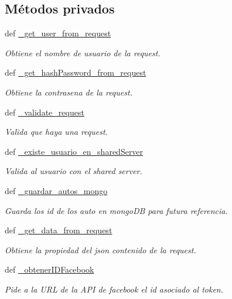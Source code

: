 \subsection*{Métodos privados}
\begin{DoxyCompactItemize}
\item 
def \hyperlink{classsrc_1_1resources_1_1auth_1_1_auth_ad45756ae9f2bf3840d6fe69fc305f86d}{\-\_\-get\-\_\-user\-\_\-from\-\_\-request}
\begin{DoxyCompactList}\small\item\em Obtiene el nombre de usuario de la request. \end{DoxyCompactList}\item 
def \hyperlink{classsrc_1_1resources_1_1auth_1_1_auth_a85f8056c2198f62284ada1f9f40a72f2}{\-\_\-get\-\_\-hash\-Password\-\_\-from\-\_\-request}
\begin{DoxyCompactList}\small\item\em Obtiene la contrasena de la request. \end{DoxyCompactList}\item 
def \hyperlink{classsrc_1_1resources_1_1auth_1_1_auth_acd72657f2bddc8a60a3103f418460d57}{\-\_\-validate\-\_\-request}
\begin{DoxyCompactList}\small\item\em Valida que haya una request. \end{DoxyCompactList}\item 
def \hyperlink{classsrc_1_1resources_1_1auth_1_1_auth_ab140f80e50617f4d4f4a58b40391710f}{\-\_\-existe\-\_\-usuario\-\_\-en\-\_\-shared\-Server}
\begin{DoxyCompactList}\small\item\em Valida al usuario con el shared server. \end{DoxyCompactList}\item 
def \hyperlink{classsrc_1_1resources_1_1auth_1_1_auth_ae28ce0ad34a3827db3783b0e83d967b5}{\-\_\-guardar\-\_\-autos\-\_\-mongo}
\begin{DoxyCompactList}\small\item\em Guarda los id de los auto en mongo\-D\-B para futura referencia. \end{DoxyCompactList}\item 
def \hyperlink{classsrc_1_1resources_1_1auth_1_1_auth_ab01ae63d8db493200c7ef0a812d9d7e2}{\-\_\-get\-\_\-data\-\_\-from\-\_\-request}
\begin{DoxyCompactList}\small\item\em Obtiene la propiedad del json contenido de la request. \end{DoxyCompactList}\item 
def \hyperlink{classsrc_1_1resources_1_1auth_1_1_auth_ae285136c047a884a24848b3448c5c77b}{\-\_\-obtener\-I\-D\-Facebook}
\begin{DoxyCompactList}\small\item\em Pide a la U\-R\-L de la A\-P\-I de facebook el id asociado al token. \end{DoxyCompactList}\end{DoxyCompactItemize}


